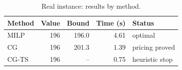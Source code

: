 \begin{table}[!ht]
\centering
\caption{Real instance: results by method.\label{tab8}}
\small
\begin{tabular*}{\columnwidth}{@{\extracolsep\fill}lrrrl@{\extracolsep\fill}}
\toprule
\textbf{Method} & \textbf{Value} & \textbf{Bound} & \textbf{Time (s)} & \textbf{Status} \\
\midrule
MILP & 196 & 196.0 & 4.61 & optimal \\
CG & 196 & 201.3 & 1.39 & pricing proved \\
CG-TS & 196 & -- & 0.75 & heuristic stop \\
\bottomrule
\end{tabular*}
\end{table}
